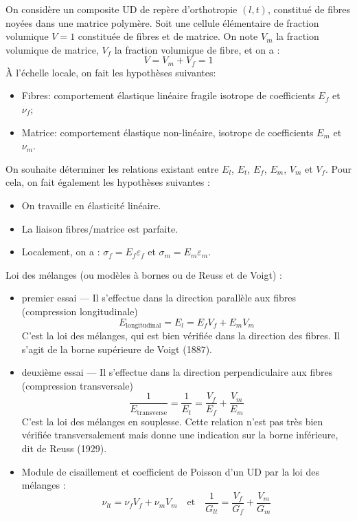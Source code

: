 On considère un composite UD de repère d'orthotropie $(l,t)$, constitué de fibres noyées dans
une matrice polymère. Soit une cellule élémentaire de fraction volumique $V = 1$ constituée de
fibres et de matrice. On note
$V_m$ la fraction volumique de matrice,
$V_f$ la fraction volumique de fibre, et on a :
\begin{equation} V = V_m + V_f =1 \end{equation}
\medskipvm
À l'échelle locale, on fait les hypothèses suivantes:
\begin{itemize}
   \item Fibres: comportement élastique linéaire fragile isotrope de coefficients $E_f$ et $\nu_f$;
   \item Matrice: comportement élastique non-linéaire, isotrope de coefficients $E_m$ et $\nu_m$.
\end{itemize}
\medskipvm
On souhaite déterminer les relations existant entre $E_l$, $E_t$, $E_f$, $E_m$, $V_m$ et $V_f$.
\medskipvm
Pour cela, on fait également les hypothèses suivantes :
\begin{itemize}
   \item On travaille en élasticité linéaire.
   \item La liaison fibres/matrice est parfaite.
   \item Localement, on a : $\sigma_f = E_f \varepsilon_f$  et $\sigma_m = E_m \varepsilon_m$.
\end{itemize}
\medskipvm
Loi des mélanges (ou modèles à bornes ou de Reuss et de Voigt) :
\begin{itemize}
	\item premier essai --- Il s'effectue dans la direction parallèle aux fibres (compression longitudinale)
		\begin{equation} E_{\text{longitudinal}}=E_l=E_fV_f+E_mV_m \end{equation}
		C'est la loi des mélanges, qui est bien vérifiée dans la direction des fibres.
		Il s'agit de la borne supérieure de Voigt (1887).
	\item deuxième essai --- Il s'effectue dans la direction perpendiculaire aux fibres (compression transversale)
		\begin{equation}\dfrac1{E_{\text{transverse}}}=\dfrac1{E_t} = \dfrac{V_f}{E_f}+\dfrac{V_m}{E_m}\end{equation}
		C'est la loi des mélanges en souplesse.
		Cette relation n'est pas très bien vérifiée transversalement mais donne une
		indication sur la borne inférieure, dit de Reuss (1929).
	\item Module de cisaillement et coefficient de Poisson
		d'un UD par la loi des mélanges :
		\begin{equation}\nu_{lt}=\nu_fV_f+\nu_mV_m\quad\text{et}\quad\dfrac1{G_{lt}} = \dfrac{V_f}{G_f}+\dfrac{V_m}{G_m}\end{equation}
\end{itemize}
